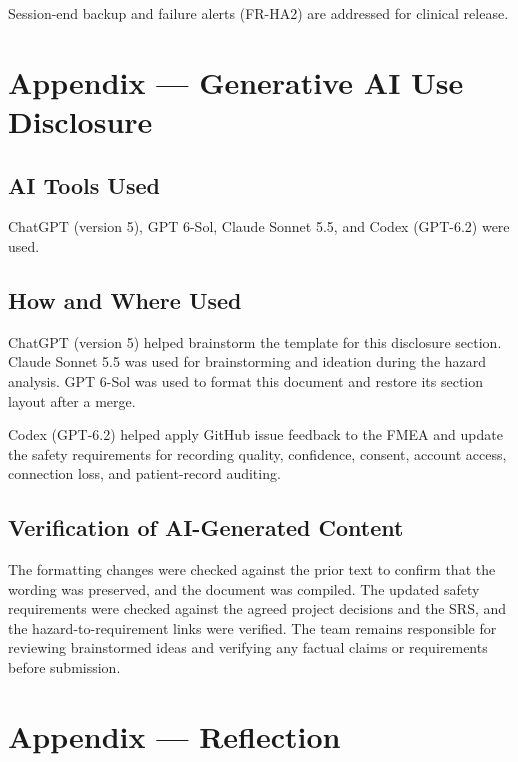 \documentclass{article}
\begin{document}
Session-end backup and failure alerts (FR-HA2) are addressed for clinical
release.

\newpage{}

\section{Appendix --- Generative AI Use Disclosure}

\subsection{AI Tools Used}

ChatGPT (version 5), GPT 6-Sol, Claude Sonnet 5.5, and Codex (GPT-6.2) were used.

\subsection{How and Where Used}

ChatGPT (version 5) helped brainstorm the template for this disclosure section. Claude Sonnet 5.5 was used for brainstorming and ideation during the hazard analysis. GPT 6-Sol was used to format this document and restore its section layout after a merge.

Codex (GPT-6.2) helped apply GitHub issue feedback to the FMEA and update the
safety requirements for recording quality, confidence, consent, account access,
connection loss, and patient-record auditing.

\subsection{Verification of AI-Generated Content}

The formatting changes were checked against the prior text to confirm that the wording was preserved, and the document was compiled. The updated safety requirements were checked against the agreed project
decisions and the SRS, and the hazard-to-requirement links were verified.
The team remains responsible for reviewing brainstormed ideas and verifying
any factual claims or requirements before submission.

\newpage{}

\section{Appendix --- Reflection}


\end{document}

